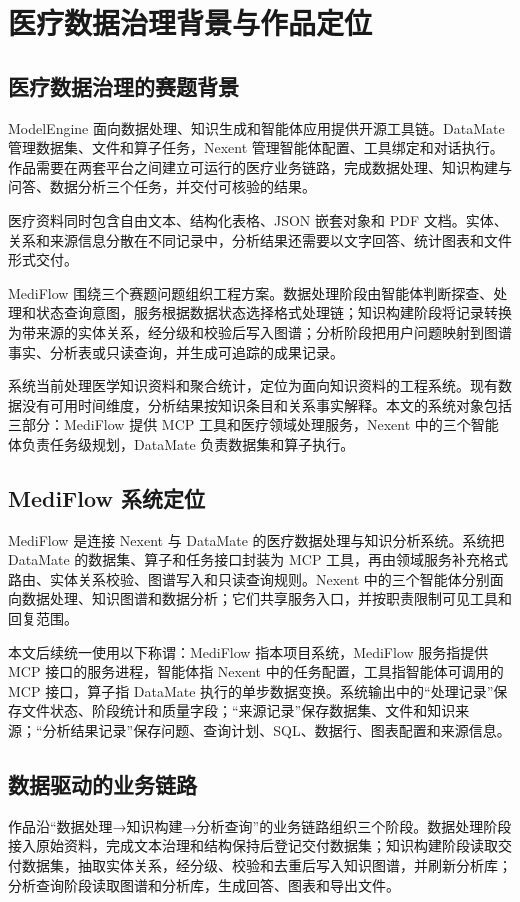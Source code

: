 \chapter{医疗数据治理背景与作品定位}

\section{医疗数据治理的赛题背景}

ModelEngine 面向数据处理、知识生成和智能体应用提供开源工具链。DataMate 管理数据集、文件和算子任务，Nexent 管理智能体配置、工具绑定和对话执行。作品需要在两套平台之间建立可运行的医疗业务链路，完成数据处理、知识构建与问答、数据分析三个任务，并交付可核验的结果。

医疗资料同时包含自由文本、结构化表格、JSON 嵌套对象和 PDF 文档。实体、关系和来源信息分散在不同记录中，分析结果还需要以文字回答、统计图表和文件形式交付。

MediFlow 围绕三个赛题问题组织工程方案。数据处理阶段由智能体判断探查、处理和状态查询意图，服务根据数据状态选择格式处理链；知识构建阶段将记录转换为带来源的实体关系，经分级和校验后写入图谱；分析阶段把用户问题映射到图谱事实、分析表或只读查询，并生成可追踪的成果记录。

系统当前处理医学知识资料和聚合统计，定位为面向知识资料的工程系统。现有数据没有可用时间维度，分析结果按知识条目和关系事实解释。本文的系统对象包括三部分：MediFlow 提供 MCP 工具和医疗领域处理服务，Nexent 中的三个智能体负责任务级规划，DataMate 负责数据集和算子执行。


\section{MediFlow 系统定位}

MediFlow 是连接 Nexent 与 DataMate 的医疗数据处理与知识分析系统。系统把 DataMate 的数据集、算子和任务接口封装为 MCP 工具，再由领域服务补充格式路由、实体关系校验、图谱写入和只读查询规则。Nexent 中的三个智能体分别面向数据处理、知识图谱和数据分析；它们共享服务入口，并按职责限制可见工具和回复范围。

本文后续统一使用以下称谓：MediFlow 指本项目系统，MediFlow 服务指提供 MCP 接口的服务进程，智能体指 Nexent 中的任务配置，工具指智能体可调用的 MCP 接口，算子指 DataMate 执行的单步数据变换。系统输出中的“处理记录”保存文件状态、阶段统计和质量字段；“来源记录”保存数据集、文件和知识来源；“分析结果记录”保存问题、查询计划、SQL、数据行、图表配置和来源信息。

\section{数据驱动的业务链路}

作品沿“数据处理→知识构建→分析查询”的业务链路组织三个阶段。数据处理阶段接入原始资料，完成文本治理和结构保持后登记交付数据集；知识构建阶段读取交付数据集，抽取实体关系，经分级、校验和去重后写入知识图谱，并刷新分析库；分析查询阶段读取图谱和分析库，生成回答、图表和导出文件。
